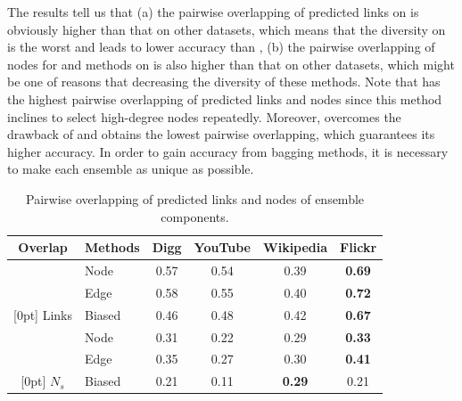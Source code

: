 The results tell us that (a) the pairwise overlapping of predicted links on \Flickr is
obviously higher than that on other datasets, which means that the diversity on \Flickr is the
worst and leads to lower accuracy than \NMF, (b) the pairwise overlapping of nodes for
\Node and \Edge methods on \Flickr is also higher than that on other datasets, which might be
one of reasons that decreasing the diversity of these methods. Note that \Edge has the highest
pairwise overlapping of predicted links and nodes since this method inclines to select high-degree
nodes repeatedly. Moreover, \Biased overcomes the drawback of \Edge and obtains the lowest pairwise
overlapping, which guarantees its higher accuracy. In order to gain accuracy from bagging methods, it
is necessary to make each ensemble as unique as possible.




\begin{table}
\caption{Pairwise overlapping of predicted links and nodes of ensemble components.}
\label{tab_limitations}
\vspace{-2ex}
\centering
\newcommand{\tabincell}[2]{\begin{tabular}{@{}#1@{}}#2\end{tabular}}
\begin{tabular}{c|l|c|c|c|c}
\hline \hline Overlap & Methods & Digg & YouTube & Wikipedia & Flickr \\
\hline \hline
& Node & 0.57 & 0.54 & 0.39 & \textbf{0.69} \\
& Edge & 0.58 & 0.55 & 0.40 & \textbf{0.72} \\
\raisebox{2.5ex}[0pt]{ Links } & Biased & 0.46 & 0.48 & 0.42 & \textbf{0.67} \\
\hline
& Node & 0.31 & 0.22 & 0.29 & \textbf{0.33} \\
& Edge & 0.35 & 0.27 & 0.30 & \textbf{0.41} \\
\raisebox{2.5ex}[0pt]{ $N_s$ } & Biased & 0.21 & 0.11 & \textbf{0.29} & 0.21 \\
\hline \hline
\end{tabular}
\end{table}




